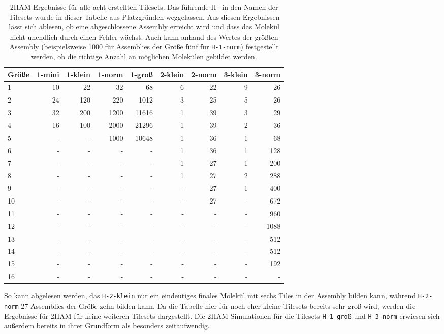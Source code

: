 \begin{table}
    \begin{tabular}{lrrrrrrrr}
        Größe & 1-mini & 1-klein & 1-norm & 1-groß & 2-klein & 2-norm & 3-klein & 3-norm\\\hline
        1 & 10 & 22  & 32   & 68    & 6 & 22 & 9 & 26\\
        2 & 24 & 120 & 220  & 1012  & 3 & 25 & 5 & 26\\
        3 & 32 & 200 & 1200 & 11616 & 1 & 39 & 3 & 29\\
        4 & 16 & 100 & 2000 & 21296 & 1 & 39 & 2 & 36\\
        5 & -  & -   & 1000 & 10648 & 1 & 36 & 1 & 68\\
        6 & -  & -   & -    & -     & 1 & 36 & 1 & 128\\
        7 & -  & -   & -    & -     & 1 & 27 & 1 & 200\\
        8 & -  & -   & -    & -     & 1 & 27 & 2 & 288\\
        9 & -  & -   & -    & -     & - & 27 & 1 & 400\\
        10 & - & -   & -    & -     & - & 27 & - & 672\\
        11 & - & -   & -    & -     & - & -  & - & 960\\
        12 & - & -   & -    & -     & - & -  & - & 1088\\
        13 & - & -   & -    & -     & - & -  & - & 512\\
        14 & - & -   & -    & -     & - & -  & - & 512\\
        15 & - & -   & -    & -     & - & -  & - & 192\\
        16 & - & -   & -    & -     & - & -  & - & - \\\hline
    \end{tabular}
    \caption[2HAM Ergebnisse]{2HAM Ergebnisse für alle acht erstellten Tilesets. Das führende \glqq H-\grqq\, in den Namen der Tilesets wurde in dieser Tabelle aus Platzgründen weggelassen. Aus diesen Ergebnissen lässt sich ablesen, ob eine abgeschlossene Assembly erreicht wird und dass das Molekül nicht unendlich durch einen Fehler wächst. Auch kann anhand des Wertes der größten Assembly (beispielsweise 1000 für Assemblies der Größe fünf für \texttt{H-1-norm}) festgestellt werden, ob die richtige Anzahl an möglichen Molekülen gebildet werden.}
    \label{tab:2HAM_assemblies}
\end{table}

So kann abgelesen werden, das \texttt{H-2-klein} nur ein eindeutiges finales Molekül mit sechs Tiles in der Assembly  bilden kann, während \texttt{H-2-norm} 27 Assemblies der Größe zehn bilden kann. Da die Tabelle hier für noch eher kleine Tilesets bereits sehr groß wird, werden die Ergebnisse für 2HAM für keine weiteren Tilesets dargestellt. Die 2HAM-Simulationen für die Tilesets \texttt{H-1-groß} und \texttt{H-3-norm} erwiesen sich außerdem bereits in ihrer Grundform als besonders zeitaufwendig. 

